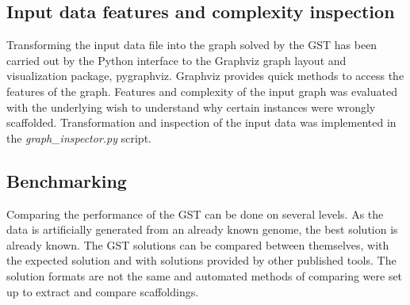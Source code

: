 \documentclass[12pt]{article}
\begin{document}
\subsection{Input data features and complexity inspection}
Transforming the input data file into the graph solved by the GST has been carried out by the Python interface to the Graphviz graph layout and visualization package, pygraphviz. Graphviz provides quick methods to access the features of the graph. Features and complexity of the input graph was evaluated with the underlying wish to understand why certain instances were wrongly scaffolded. Transformation and inspection of the input data was implemented in the \textit{graph\_inspector.py} script. 

\subsection{Benchmarking} \label{sec:benchmarking}
Comparing the performance of the GST can be done on several levels. As the data is artificially generated from an already known genome, the best solution is already known. The GST solutions can be compared between themselves, with the expected solution and with solutions provided by other published tools. The solution formats are not the same and automated methods of comparing were set up to extract and compare scaffoldings. 
\end{document}

